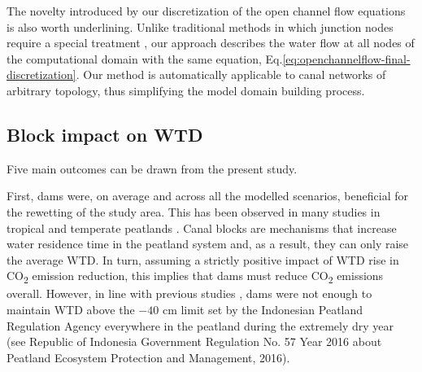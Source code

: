\documentclass[bg, manuscript]{copernicus}
\begin{document}
The  novelty introduced by our discretization of the open channel flow equations is also worth underlining.
Unlike traditional methods in which junction nodes require a special treatment \citep{cungePracticalAspectsComputational1980, novakHydraulicModellingIntroduction2010}, our approach describes the water flow at all nodes of the computational domain with the same equation, Eq.\eqref{eq:openchannelflow-final-discretization}.
Our method is automatically applicable to canal networks of arbitrary topology, thus simplifying the model domain building process.

\subsection{Block impact on WTD}
Five main outcomes can be drawn from the present study.

First, dams were, on average and across all the modelled scenarios, beneficial for the rewetting of the study area.
This has been observed in many studies in tropical and temperate peatlands \citep{putraEffectsDitchDams2021, sutiknoEffectivenessCanalBlocking2019, sutiknoWaterManagementHydrological2020, holdenImpactDitchBlocking2017, planas-clarkeEffectWaterTable2020, schimelpfenigEffectivenessDitchBlockage2014, kasihRewettingDegradedTropical2016}.
Canal blocks are mechanisms that increase water residence time in the peatland system and, as a result, they can only raise the average WTD.
In turn, assuming a strictly positive impact of WTD rise in CO\textsubscript{2} emission reduction, this implies that dams must reduce CO\textsubscript{2} emissions overall.
However, in line  with previous studies \citep{putraEffectsDitchDams2021, putraModellingPerformanceBunds2022}, dams were not enough to maintain WTD above the $-40$ \unit{cm} limit set by the Indonesian Peatland Regulation Agency  everywhere in the peatland during the extremely dry year (see Republic of Indonesia Government Regulation No. 57 Year 2016 about Peatland Ecosystem Protection and Management, 2016).
\end{document}

